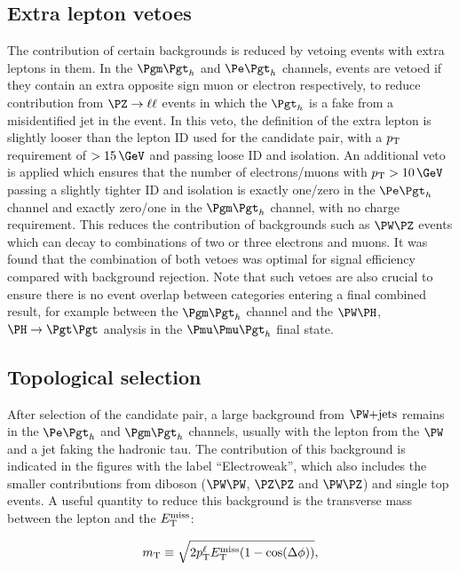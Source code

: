 \subsection{Extra lepton vetoes}

The contribution of certain backgrounds is reduced by vetoing events with extra
leptons in them. In the $\mutau$ and $\etau$ channels, events are vetoed if they contain an extra
opposite sign muon or electron respectively, to reduce contribution from 
$\PZ\to\ell\ell$ events in which the $\Pgth$ is a fake from a misidentified 
jet in the event. In this veto, the definition of the extra lepton is slightly 
looser than the lepton ID used for the candidate pair, with a $p_{\mathrm{T}}$ requirement
of $>15\,\GeV$ and passing loose ID and isolation. 
An additional veto is applied which ensures that the number of
electrons/muons with $\pt>10\,\GeV$ passing a slightly tighter ID and isolation
is exactly one/zero in the $\etau$ channel and exactly zero/one in the $\mutau$ channel, with no charge
requirement. This reduces the contribution of backgrounds such as $\PW\PZ$
events which can decay to combinations of two or three electrons and muons. 
It was found that the combination of both vetoes was optimal for signal
efficiency compared with background rejection. Note that such vetoes are also crucial 
to ensure there is no event overlap between categories entering a final combined 
result, for example between the $\mutau$ channel and the 
$\PW\PH$, $\PH\to\Pgt\Pgt$ analysis in the $\Pmu\Pmu\Pgth$ final state. 

\subsection{Topological selection}
\label{sec:topologicalselection}

After selection of the candidate pair, a large background from $\WJets$ remains
in the $\etau$ and $\mutau$ channels, usually with the lepton from the $\PW$ and
a jet faking the hadronic tau. The contribution of this background is indicated
in the figures with the label ``Electroweak'', which also includes the smaller
contributions from diboson ($\PW\PW$, $\PZ\PZ$ and
$\PW\PZ$) and single top events. A useful quantity to reduce this background is
the transverse mass between the lepton and the $E_{\mathrm{T}}^{\text{miss}}$:

\begin{equation}
m_{\text{T}}\equiv\sqrt{2p_{\mathrm{T}}^{\ell}E_{\mathrm{T}}^{\text{miss}}(1-\cos(\Delta\phi))},
\end{equation}

